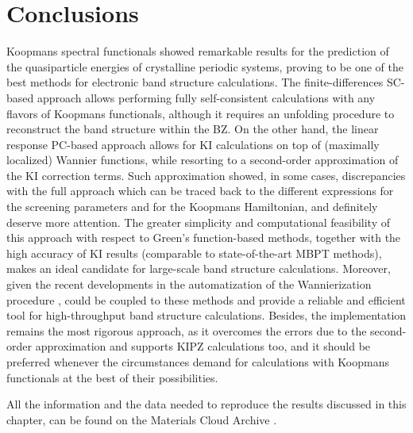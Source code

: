 \section{Conclusions\label{sec:results-conclusions}}
Koopmans spectral functionals showed remarkable results for the prediction of the quasiparticle energies of crystalline periodic systems, proving to be one of the best methods for electronic band structure calculations. The finite-differences SC-based approach allows performing fully self-consistent calculations with any flavors of Koopmans functionals, although it requires an unfolding procedure to reconstruct the band structure within the BZ. On the other hand, the linear response PC-based approach allows for KI calculations on top of (maximally localized) Wannier functions, while resorting to a second-order approximation of the KI correction terms. Such approximation showed, in some cases, discrepancies with the full approach which can be traced back to the different expressions for the screening parameters and for the Koopmans Hamiltonian, and definitely deserve more attention. The greater simplicity and computational feasibility of this approach with respect to Green's function-based methods, together with the high accuracy of KI results (comparable to state-of-the-art MBPT methods), makes \kcw an ideal candidate for large-scale band structure calculations. Moreover, given the recent developments in the automatization of the Wannierization procedure \cite{vitale_automated_2020,qiao_wannier_2022}, \kcw could be coupled to these methods and provide a reliable and efficient tool for high-throughput band structure calculations. Besides, the \kcp implementation remains the most rigorous approach, as it overcomes the errors due to the second-order approximation and supports KIPZ calculations too, and it should be preferred whenever the circumstances demand for calculations with Koopmans functionals at the best of their possibilities.

All the information and the data needed to reproduce the results discussed in this chapter, can be found on the Materials Cloud Archive \cite{de_gennaro_blochs_mc_2022,colonna_koopmans_mc_2021}.


